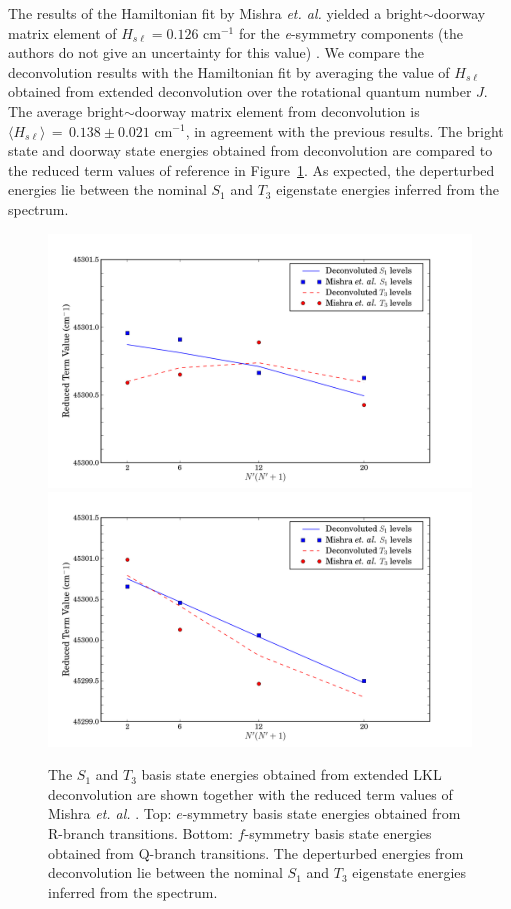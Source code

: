 \documentclass[12pt]{mitthesis}
\begin{document}
The results of the Hamiltonian fit by Mishra \emph{et. al.} yielded a
bright$\sim$doorway matrix element of $H_{s\ell} = 0.126$ cm$^{-1}$
for the \emph{e}-symmetry components (the authors do not give an
uncertainty for this value) \cite{mishra04}.  We compare the
deconvolution results with the Hamiltonian fit by averaging the value
of $H_{s\ell}$ obtained from extended deconvolution over the
rotational quantum number $J$.  The average bright$\sim$doorway matrix
element from deconvolution is $\langle H_{s\ell} \rangle \, = \, 0.138
\pm 0.021$ cm$^{-1}$, in agreement with the previous results.  The
bright state and doorway state energies obtained from deconvolution
are compared to the reduced term values of reference \cite{mishra04}
in Figure~\ref{fig:ryan-comparison}.  As expected, the deperturbed
energies lie between the nominal $S_1$ and $T_3$ eigenstate
energies inferred from the spectrum.

\begin{figure}
  \caption{The $S_1$ and $T_3$ basis state energies obtained from
    extended LKL deconvolution are shown together with the reduced
    term values of Mishra \emph{et. al.} \cite{mishra04}.  Top:
    $e$-symmetry basis state energies obtained from R-branch
    transitions.  Bottom: $f$-symmetry basis state energies obtained
    from Q-branch transitions. The deperturbed energies from
    deconvolution lie between the nominal $S_1$ and $T_3$ eigenstate
    energies inferred from the spectrum.}
  \label{fig:ryan-comparison}
  \centering
  \includegraphics[width=6.5in]{ryan-comparison-r.png}
  \includegraphics[width=6.5in]{ryan-comparison-q.png}
\end{figure}
\end{document}
